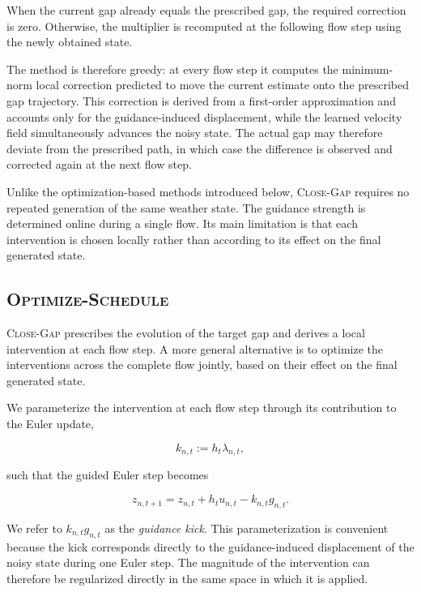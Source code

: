 When the current gap already equals the prescribed gap, the required
correction is zero. Otherwise, the multiplier is recomputed at the following
flow step using the newly obtained state.

The method is therefore greedy: at every flow step it computes the
minimum-norm local correction predicted to move the current estimate onto the
prescribed gap trajectory. This correction is derived from a first-order
approximation and accounts only for the guidance-induced displacement, while
the learned velocity field simultaneously advances the noisy state. The actual
gap may therefore deviate from the prescribed path, in which case the
difference is observed and corrected again at the next flow step.

Unlike the optimization-based methods introduced below, \textsc{Close-Gap}
requires no repeated generation of the same weather state. The guidance
strength is determined online during a single flow. Its main limitation is
that each intervention is chosen locally rather than according to its effect
on the final generated state.

\subsection{\textsc{Optimize-Schedule}}
\label{sec:optimize-schedule}

\textsc{Close-Gap} prescribes the evolution of the target gap and derives a
local intervention at each flow step. A more general alternative is to optimize
the interventions across the complete flow jointly, based on their effect on
the final generated state.

We parameterize the intervention at each flow step through its contribution to
the Euler update,

\begin{equation}
    k_{n,t}
    :=
    h_t\lambda_{n,t},
    \label{eq:guidance-kick}
\end{equation}

such that the guided Euler step becomes

\begin{equation}
    z_{n,t+1}
    =
    z_{n,t}
    +
    h_t u_{n,t}
    -
    k_{n,t}g_{n,t}.
    \label{eq:kick-euler-update}
\end{equation}

We refer to $k_{n,t}g_{n,t}$ as the \emph{guidance kick}. This
parameterization is convenient because the kick corresponds directly to the
guidance-induced displacement of the noisy state during one Euler step. The
magnitude of the intervention can therefore be regularized directly in the
same space in which it is applied.

